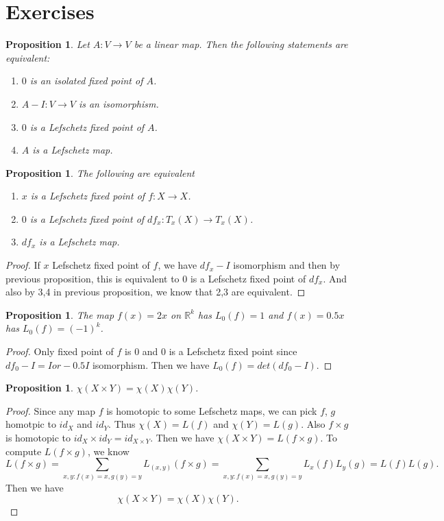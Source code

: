 \documentclass[psamsfonts]{amsart}
\newtheorem{prop}[theorem]{Proposition}
\theoremstyle{definition}
\theoremstyle{remark}
\numberwithin{equation}{section}
\begin{document}
	\section{Exercises}
		\begin{prop}
			Let $A: V \to V$ be a linear map. Then the following statements are equivalent:
			\begin{enumerate}
				\item $0$ is an isolated fixed point of $A$.
				\item $A-I: V \to V$ is an isomorphism.
				\item $0$ is a Lefschetz fixed point of $A$.
				\item $A$ is a Lefschetz map.
			\end{enumerate}
		\end{prop}
		\begin{prop}
			The following are equivalent
			\begin{enumerate}
				\item $x$ is a Lefschetz fixed point of $f: X \to X$.
				\item $0$ is a Lefschetz fixed point of $df_x: T_x(X) \to T_x(X)$.
				\item $df_x$ is a Lefschetz map.
			\end{enumerate}
		\end{prop}
		\begin{proof}
			If $x$ Lefschetz fixed point of $f$, we have $df_x - I$ isomorphism and then by previous proposition, this is equivalent to $0$ is a Lefschetz fixed point of $df_x$. And also by 3,4 in previous proposition, we know that 2,3 are equivalent.
		\end{proof}
		\begin{prop}
			The map $f(x) = 2x$ on $\mathbb{R}^k$ has $L_0(f)=1$ and $f(x) = 0.5x$ has $L_0(f) = (-1)^k$.
		\end{prop}
		\begin{proof}
			Only fixed point of $f$ is $0$ and $0$ is  a Lefschetz fixed point since $df_0 - I = I or -0.5I$ isomorphism. Then we have $L_0(f) = det(df_0 - I)$.
		\end{proof}
		\begin{prop}
			$\chi(X \times Y) = \chi(X) \chi(Y)$.
		\end{prop}
		\begin{proof}
			Since any map $f$ is homotopic to some Lefschetz maps, we can pick $f$, $g$ homotpic to $id_X$ and $id_Y$. Thus $\chi(X) = L(f)$ and $\chi(Y) = L(g)$. Also $f \times g$ is homotopic to $id_X \times id_Y = id_{X \times Y}$. Then we have $\chi(X \times Y) = L(f \times g)$. To compute $L(f \times g)$, we know
			\begin{equation}
				L(f \times g) = \sum_{x,y:f(x)=x,g(y)=y} L_{(x,y)}(f \times g) = \sum_{x,y:f(x)=x,g(y)=y} L_x(f)L_y(g) = L(f)L(g).
			\end{equation}
			Then we have
			\begin{equation}
				\chi(X\times Y) = \chi(X) \chi(Y).
			\end{equation}
		\end{proof}
\end{document}
